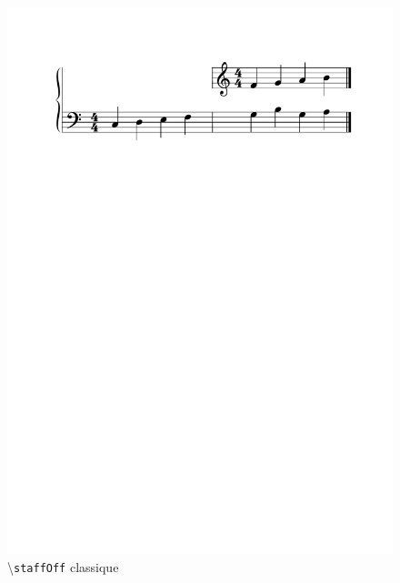 \documentclass{article}
\newenvironment{gmncode}	{\vspace{-2mm}\small\verbatim}{\endverbatim\vspace{-2mm}}
\newcommand{\code}[1]		{{\small \texttt{#1}}}
\newcommand{\guidotag}[1]	{\textbackslash\code{#1}}
\begin{document}
\begin{figure}[h]

\begin{center}
\includegraphics[width=\columnwidth]{img/staffoff.pdf}
\end{center}
\caption{ \guidotag{staffOff} classique}
\label{fig:staffoffsimple}
\end{figure}

\end{document}
